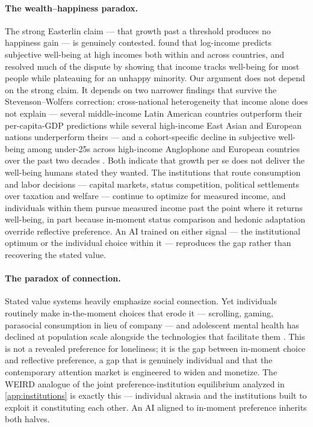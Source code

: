 \documentclass{article}
\theoremstyle{plain}
\theoremstyle{definition}
\theoremstyle{remark}
\begin{document}
\paragraph{The wealth--happiness paradox.} The strong Easterlin claim --- that growth past a threshold produces no happiness gain --- is genuinely contested. \citet{stevensonwolfers2008} found that log-income predicts subjective well-being at high incomes both within and across countries, and \citet{killingsworth2023income} resolved much of the dispute by showing that income tracks well-being for most people while plateauing for an unhappy minority. Our argument does not depend on the strong claim. It depends on two narrower findings that survive the Stevenson--Wolfers correction: cross-national heterogeneity that income alone does not explain --- several middle-income Latin American countries outperform their per-capita-GDP predictions while several high-income East Asian and European nations underperform theirs \citep{whr2026} --- and a cohort-specific decline in subjective well-being among under-25s across high-income Anglophone and European countries over the past two decades \citep{whr2026, haidt2024anxious}. Both indicate that growth per se does not deliver the well-being humans stated they wanted. The institutions that route consumption and labor decisions --- capital markets, status competition, political settlements over taxation and welfare --- continue to optimize for measured income, and individuals within them pursue measured income past the point where it returns well-being, in part because in-moment status comparison and hedonic adaptation override reflective preference. An AI trained on either signal --- the institutional optimum or the individual choice within it --- reproduces the gap rather than recovering the stated value.

\paragraph{The paradox of connection.} Stated value systems heavily emphasize social connection. Yet individuals routinely make in-the-moment choices that erode it --- scrolling, gaming, parasocial consumption in lieu of company --- and adolescent mental health has declined at population scale alongside the technologies that facilitate them \citep{whr2026, haidt2024anxious}. This is not a revealed preference for loneliness; it is the gap between in-moment choice and reflective preference, a gap that is genuinely individual and that the contemporary attention market is engineered to widen and monetize. The WEIRD analogue of the joint preference-institution equilibrium analyzed in \cref{app:institutions} is exactly this --- individual akrasia and the institutions built to exploit it constituting each other. An AI aligned to in-moment preference inherits both halves.
\end{document}
